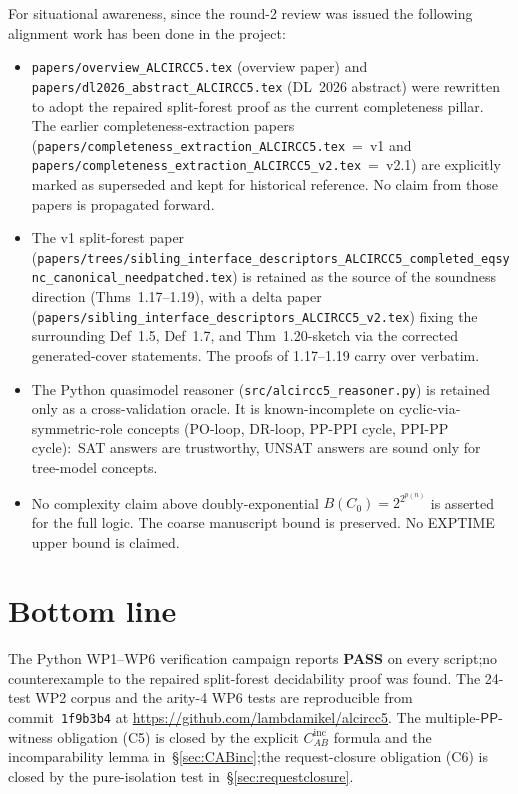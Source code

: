 \documentclass[11pt]{article}
\newcommand{\PP}{\mathsf{PP}}
\newcommand{\PASS}{\textcolor{black!70!green}{\textbf{PASS}}}
\begin{document}
For situational awareness, since the round-2 review was issued the
following alignment work has been done in the project:
\begin{itemize}[leftmargin=2em]
  \item \texttt{papers/overview\_ALCIRCC5.tex} (overview paper)
    and \texttt{papers/dl2026\_abstract\_ALCIRCC5.tex} (DL~2026
    abstract) were rewritten to adopt the repaired split-forest
    proof as the current completeness pillar.  The earlier
    completeness-extraction papers
    (\texttt{papers/completeness\_extraction\_ALCIRCC5.tex}~=~v1
    and
    \texttt{papers/completeness\_extraction\_ALCIRCC5\_v2.tex}~=~v2.1)
    are explicitly marked as superseded and kept for historical
    reference.  No claim from those papers is propagated forward.
  \item The v1 split-forest paper
    (\texttt{papers/trees/sibling\_interface\_descriptors\_ALCIRCC5\_completed\_eqsync\_canonical\_needpatched.tex})
    is retained as the source of the soundness direction
    (Thms~1.17--1.19), with a delta paper
    (\texttt{papers/sibling\_interface\_descriptors\_ALCIRCC5\_v2.tex})
    fixing the surrounding Def~1.5, Def~1.7, and Thm~1.20-sketch
    via the corrected generated-cover statements.  The proofs of
    1.17--1.19 carry over verbatim.
  \item The Python quasimodel reasoner
    (\texttt{src/alcircc5\_reasoner.py}) is retained only as a
    cross-validation oracle.  It is known-incomplete on
    cyclic-via-symmetric-role concepts (PO-loop, DR-loop, PP-PPI
    cycle, PPI-PP cycle):\ SAT answers are trustworthy, UNSAT
    answers are sound only for tree-model concepts.
  \item No complexity claim above doubly-exponential
    \(B(C_0) = 2^{2^{p(n)}}\) is asserted for the full logic.  The
    coarse manuscript bound is preserved.  No EXPTIME upper bound is
    claimed.
\end{itemize}

\section*{Bottom line}

The Python WP1--WP6 verification campaign reports \PASS{} on
every script;\@ no counterexample to the repaired split-forest
decidability proof was found.  The 24-test WP2 corpus and the
arity-4 WP6 tests are reproducible from commit~\texttt{1f9b3b4}
at \url{https://github.com/lambdamikel/alcircc5}.  The
multiple-\(\PP\)-witness obligation (C5) is closed by the
explicit \(C_{AB}^{\mathrm{inc}}\) formula and the incomparability
lemma in~\S\ref{sec:CABinc};\@ the request-closure obligation
(C6) is closed by the pure-isolation test in~\S\ref{sec:requestclosure}.
\end{document}

